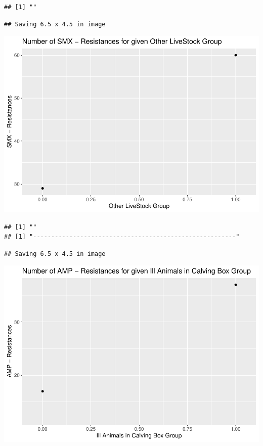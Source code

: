 \documentclass[
]{article}
\begin{document}
\begin{verbatim}
## [1] ""
\end{verbatim}

\begin{verbatim}
## Saving 6.5 x 4.5 in image
\end{verbatim}

\includegraphics{NResistenzen_files/figure-latex/binary_or_nominal_variables-20.pdf}

\begin{verbatim}
## [1] ""
## [1] "--------------------------------------------------------"
\end{verbatim}

\begin{verbatim}
## Saving 6.5 x 4.5 in image
\end{verbatim}

\includegraphics{NResistenzen_files/figure-latex/binary_or_nominal_variables-21.pdf}
\end{document}
